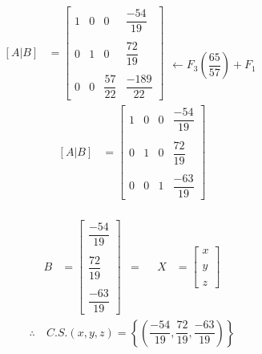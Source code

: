 \documentclass[10pt, a4paper]{article}
\begin{document}
\begin{multicols*}{2}
  \begin{align*}
    \left[A|B\right]&=\left[
      \begin{array}{ccc|c}
        1 & 0 & 0 & \dfrac{-54}{19} \\\\
        0 & 1 & 0 & \dfrac{72}{19} \\\\
        0 & 0 & \dfrac{57}{22} & \dfrac{-189}{22}
      \end{array}
    \right]
    \begin{array}{r}
      \\\\
      \\\\\\
      \leftarrow F_3\left(\dfrac{65}{57}\right)+F_1
    \end{array}
  \end{align*}
  \begin{align*}
    \left[A|B\right]&=\left[
      \begin{array}{ccc|c}
        1 & 0 & 0 & \dfrac{-54}{19} \\\\
        0 & 1 & 0 & \dfrac{72}{19} \\\\
        0 & 0 & 1 & \dfrac{-63}{19} 
      \end{array}
    \right]
  \end{align*}
  \\
  \begin{align*}
    B&=\left[
      \begin{array}{c}
        \dfrac{-54}{19}\\\\
        \dfrac{72}{19}\\\\
        \dfrac{-63}{19}
      \end{array}
    \right]
    &=
    &&X&=\left[
      \begin{array}{c}
        x \\\\
        y \\\\
        z 
      \end{array}
    \right]
  \end{align*}
  \begin{align*}
    \therefore \ &C.S. \left(x,y,z\right) = \left\{\left(\dfrac{-54}{19},\dfrac{72}{19},\dfrac{-63}{19}\right)\right\}
  \end{align*}
  \columnseprule=1pt
\end{multicols*}
\newpage
\end{document}
